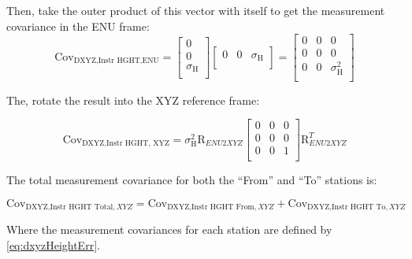 Then, take the outer product of this vector with itself to get the measurement covariance in the ENU frame:
\begin{equation}\label{eq:heightXYZ} %
    \text{Cov}_{\text{DXYZ,Instr HGHT,ENU}} =\left[ \begin{array}{c} 0 \\ 0 \\ \sigma_{\text{H}} \\ \end{array} \right] \left[ \begin{array}{ccc} 0 & 0 & \sigma_{\text{H}} \\ \end{array} \right] = \left[ \begin{array}{ccc} 0 & 0 & 0\\ 0 & 0 & 0\\ 0 & 0 & \sigma_{\text{H}}^2 \\ \end{array} \right]
\end{equation}

The, rotate the result into the XYZ reference frame:

\begin{equation}\label{eq:dxyzHeightErr} %
    \text{Cov}_{\text{DXYZ,Instr HGHT, XYZ}} = \sigma_{\text{H}}^2 \text{R}_{ENU2XYZ} \left[ \begin{array}{ccc} 
                                                                                0 & 0 & 0 \\
                                                                                0 & 0 & 0 \\
                                                                                0 & 0 & 1 \\
                                                                            \end{array} \right] \text{R}_{ENU2XYZ}^{T}
\end{equation}

The total measurement covariance for both the ``From'' and ``To'' stations is:

\begin{equation}\label{eq:totalDXYZHeightCov} %
    \text{Cov}_{\text{DXYZ,Instr HGHT Total},XYZ} = \text{Cov}_{\text{DXYZ,Instr HGHT From},XYZ} + \text{Cov}_{\text{DXYZ,Instr HGHT To},XYZ}
\end{equation}

Where the measurement covariances for each station are defined by \ref{eq:dxyzHeightErr}.

